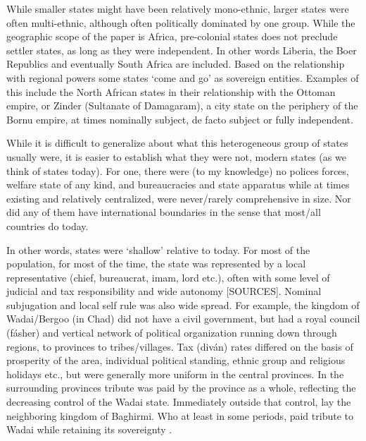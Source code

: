 \documentclass[12pt]{article}
\begin{document}
While smaller states might have been relatively mono-ethnic, larger states were
often multi-ethnic, although often politically dominated by one group.  While
the geographic scope of the paper is Africa, pre-colonial states does not
preclude settler states, as long as they were independent. In other words
Liberia, the Boer Republics and eventually South Africa are included. Based on
the relationship with regional powers some states `come and go' as sovereign
entities. Examples of this include the North African states in their
relationship with the Ottoman empire, or Zinder (Sultanate of Damagaram), a city
state on the periphery of the Bornu empire, at times nominally subject, de facto
subject or fully independent. 


While it is difficult to generalize about what this heterogeneous group of
states usually were, it is easier to establish what they were not, modern states
(as we think of states today). For one, there were (to my knowledge) no polices
forces, welfare state of any kind, and bureaucracies and state apparatus while
at times existing and relatively centralized, were never/rarely comprehensive in
size. Nor did any of them have international boundaries in the sense that
most/all countries do today. 

In other words, states were `shallow' relative to today. For most of the
population, for most of the time, the state was represented by a local
representative (chief, bureaucrat, imam, lord etc.), often with some level of
judicial and tax responsibility and wide autonomy [SOURCES]. Nominal subjugation
and local self rule was also wide spread. For example, the kingdom of
Wadai/Bergoo (in Chad) did not have a civil government, but had a royal council
(fásher) and vertical network of political organization running down through
regions, to provinces to tribes/villages\citep{barth1857travels}. Tax (diván)
rates differed on the basis of prosperity of the area, individual political
standing, ethnic group and religious holidays etc., but were generally more
uniform in the central provinces. In the surrounding provinces tribute was paid
by the province as a whole, reflecting the decreasing control of the Wadai
state. Immediately outside that control, lay the neighboring kingdom of
Baghirmi. Who at least in some periods, paid tribute to Wadai while retaining
its sovereignty \citep{barth1857travels}.
\end{document}
